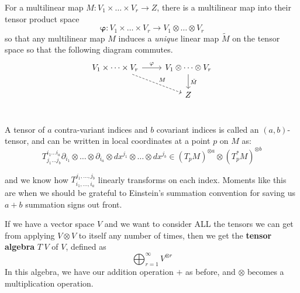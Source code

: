 \documentclass[../master.tex]{subfiles}
\begin{document}
	\begin{prop}
		For a multilinear map $M: V_1 \times \dots \times V_r \rightarrow Z$, there is a multilinear map into their tensor product space
		\begin{equation}
			\mathbf \varphi: V_1 \times \dots \times V_r \rightarrow V_1 \otimes \dots \otimes V_r
		\end{equation}
		so that any multilinear map $M$ induces a \emph{unique} linear map $\tilde M$ on the tensor space so that the following diagram commutes. 
		\[ 
		\begin{tikzcd}
		V_1 \times \dots \times V_r \arrow{r}{\varphi} \arrow[dashrightarrow]{rd}{M} & V_1 \otimes \dots \otimes V_r \arrow{d}{\tilde M} \\
		  & Z \\
		\end{tikzcd}
		\]
	\end{prop}
	
	
	
	\begin{defn}[An $(a,b)$-Tensor]
		A tensor of $a$ contra-variant indices and $b$ covariant indices is called an $(a,b)$-tensor, and can be written in local coordinates at a point $p$ on $M$ as:
		\begin{equation*}
			T_{j_1 \dots j_b}^{i_1 \dots i_a}  \partial_{i_1} \otimes \dots \otimes \partial_{i_a} \otimes dx^{j_1} \otimes \dots \otimes dx^{j_b}  \in (T_p M)^{\otimes a} \otimes (T_p^* M)^{\otimes b} 
		\end{equation*}
	\end{defn}
	and we know how $T_{i_1, \dots, i_a}^{j_1, \dots, j_b}$ linearly transforms on each index. Moments like this are when we should be grateful to Einstein's summation convention for saving us $a+b$ summation signs out front. 
	
	If we have a vector space $V$ and we want to consider ALL the tensors we can get from applying $V \otimes V$ to itself any number of times, then we get the \textbf{tensor algebra} $T^\cdot V$ of $V$, defined as
	\begin{equation}
		\bigoplus_{r=1}^\infty V^{\otimes r}
	\end{equation}
	In this algebra, we have our addition operation $+$ as before, and $\otimes$ becomes a multiplication operation.\\
\end{document}
